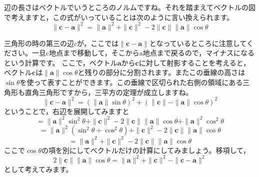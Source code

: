 \documentclass{ltjsbook}
\begin{document}
辺の長さはベクトルでいうところのノルムですね。それを踏まえてベクトルの図で考えますと，この式がいっていることは次のように言い換えられます。
\[ \| \bm{c} - \bm{a} \|^2 = \| \bm{a} \|^2 + \| \bm{c} \|^2 - 2\| \bm{c} \|\| \bm{a} \|\cos \theta \]
\begin{center}
\end{center}
三角形の時の第三の辺$c$が，ここでは$\| \bm{c} - \bm{a} \|$となっているところに注意してください。一旦c地点まで移動して，そこからa地点まで戻るので，マイナスになるという計算です。
ここで，ベクトル$\bm{a}$から$\bm{c}$に対して射影することを考えると，ベクトル$\bm{c}$は$\| \bm{a} \|\cos \theta$と残りの部分に分割されます。またこの垂線の高さは$\sin \theta$を使って表すことができます。この垂線で区切られた右側の領域にある三角形も直角三角形ですから，三平方の定理が成立しますね。
\[ \| \bm{c} - \bm{a} \|^2 = (\| \bm{a} \| \sin \theta)^2 + (\| \bm{c} \| - \| \bm{a}\|\cos \theta)^2 \]
ということで，右辺を展開してみますと
\[ = \| \bm{a} \|^2 \sin^2 \theta + \| \bm{c} \|^2 -2\| \bm{c} \| \| \bm{a}\| \cos \theta +\| \bm{a}\|^2 \cos^2 \theta \]
\[ = \| \bm{a} \|^2(\sin^2 \theta + \cos^2 \theta) + \| \bm{c} \|^2 -2\| \bm{c} \| \| \bm{a}\| \cos \theta\]
\[ = \| \bm{a} \|^2 + \| \bm{c} \|^2 -2\| \bm{c} \| \| \bm{a}\| \cos \theta\]
ここで$\cos \theta$の項を別にしてベクトルだけの計算にしてみましょう。移項して，
\[ 2\| \bm{c} \| \| \bm{a}\| \cos \theta = \| \bm{a} \|^2 + \| \bm{c} \|^2 -  \| \bm{c} - \bm{a} \|^2 \]
として考えてみます。
\end{document}
